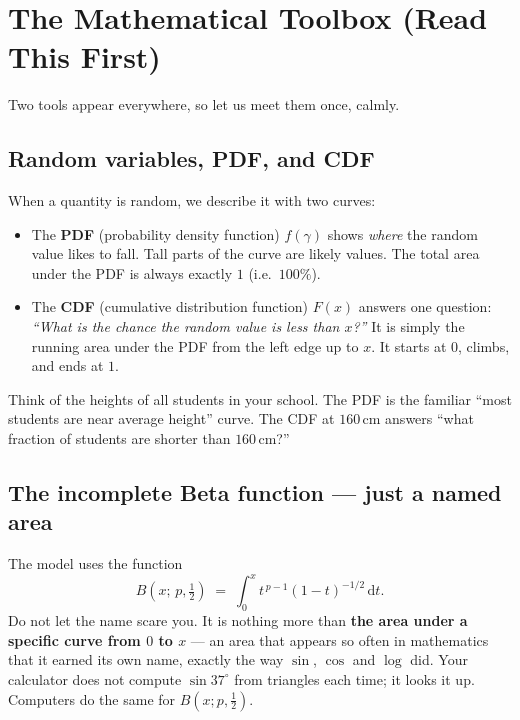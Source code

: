 \documentclass[11pt]{article}
\begin{document}
\section{The Mathematical Toolbox (Read This First)}

Two tools appear everywhere, so let us meet them once, calmly.

\subsection{Random variables, PDF, and CDF}

When a quantity is random, we describe it with two curves:

\begin{itemize}
\item The \textbf{PDF} (probability density function) $f(\gamma)$ shows \emph{where}
      the random value likes to fall. Tall parts of the curve are likely values.
      The total area under the PDF is always exactly $1$ (i.e.\ $100\%$).
\item The \textbf{CDF} (cumulative distribution function) $F(x)$ answers one question:
      \emph{``What is the chance the random value is less than $x$?''} It is simply
      the running area under the PDF from the left edge up to $x$. It starts at $0$,
      climbs, and ends at $1$.
\end{itemize}

\begin{analogybox}
Think of the heights of all students in your school. The PDF is the familiar
``most students are near average height'' curve. The CDF at $160\,$cm answers
``what fraction of students are shorter than $160\,$cm?''
\end{analogybox}

\subsection{The incomplete Beta function --- just a named area}

The model uses the function
\[
B\!\left(x;\,p,\tfrac12\right)\;=\;\int_0^x t^{\,p-1}(1-t)^{-1/2}\,\mathrm{d}t .
\]
Do not let the name scare you. It is nothing more than \textbf{the area under a
specific curve from $0$ to $x$} --- an area that appears so often in mathematics that
it earned its own name, exactly the way $\sin$, $\cos$ and $\log$ did. Your calculator
does not compute $\sin 37^\circ$ from triangles each time; it looks it up. Computers do
the same for $B(x;p,\tfrac12)$.
\end{document}
